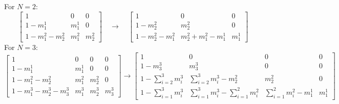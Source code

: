 \documentclass[pdflatex,sn-mathphys-num]{sn-jnl}%
\theoremstyle{thmstyleone}%
\theoremstyle{thmstyletwo}%
\theoremstyle{thmstylethree}%
\begin{document}
\vspace{0.1in}
\noindent For $N=2$:
\[
\begin{bmatrix} 1 &0 &0 \\ 1-m^1_1 &m^1_1 &0 \\ 1-m^2_1-m^2_2 &m^2_1 &m^2_2 \end{bmatrix}\quad \rightarrow \quad \begin{bmatrix} 1 &0  &0  \\  1-m^2_2 &m^2_2  &0   
\\ 1-m^2_2-m^2_1 &m^2_2+m^2_1-m^1_1  &m^1_1 
\end{bmatrix}\]
For $N=3$:
\[ \begin{bmatrix} 1 &0  &0&0  \\   1-m^1_1 &m^1_1  &0 &0  
\\ 1-m^2_1-m^2_2  &m^2_1 &m^2_2&0 
\\1-m^3_1-m^3_2-m^3_3 &m^3_1 &m^3_2&m^3_3  \end{bmatrix} \rightarrow \begin{bmatrix}   1 &0  &0&0  \\ 1-m^3_3 &m^3_3  &0 &0  
\\ 1-\sum^3_{i=2}m^3_i &\sum^3_{i=2}m^3_i-m^2_2  &m^2_2&0 
\\1-\sum^3_{i=1}m^3_i &\sum^3_{i=1}m^3_i-\sum^2_{i=1}m^2_i &\sum^2_{i=1}m^2_i-m^1_1 &m^1_1\end{bmatrix}\]



\end{document}
